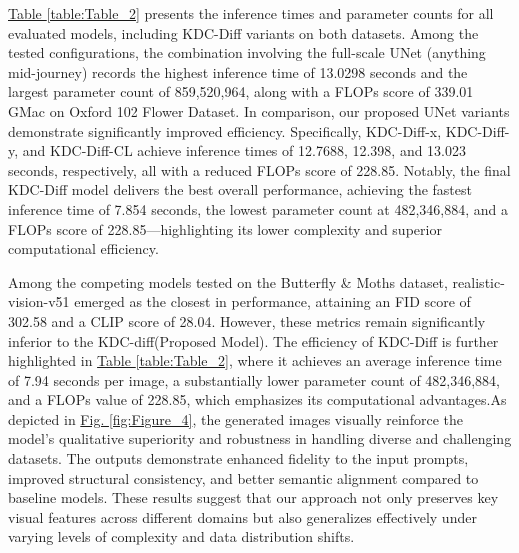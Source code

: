 \documentclass[a4paper,fleqn]{ieeetj}
\begin{document}
 \hyperref[table:Table_2]{Table \ref*{table:Table_2}} presents the inference times and parameter counts for all evaluated models, including KDC-Diff variants on both datasets. Among the tested configurations, the combination involving the full-scale UNet (anything mid-journey) records the highest inference time of 13.0298 seconds and the largest parameter count of 859,520,964, along with a FLOPs score of 339.01 GMac on Oxford 102 Flower Dataset. In comparison, our proposed UNet variants demonstrate significantly improved efficiency. Specifically, KDC-Diff-x, KDC-Diff-y, and KDC-Diff-CL achieve inference times of 12.7688, 12.398, and 13.023 seconds, respectively, all with a reduced FLOPs score of 228.85. Notably, the final KDC-Diff model delivers the best overall performance, achieving the fastest inference time of 7.854 seconds, the lowest parameter count at 482,346,884, and a FLOPs score of 228.85—highlighting its lower complexity and superior computational efficiency. 
 
 Among the competing models tested on the Butterfly \& Moths dataset, realistic-vision-v51 emerged as the closest in performance, attaining an FID score of 302.58 and a CLIP score of 28.04. However, these metrics remain significantly inferior to the KDC-diff(Proposed Model). The efficiency of KDC-Diff is further highlighted in  \hyperref[table:Table_2]{Table \ref*{table:Table_2}}, where it achieves an average inference time of 7.94 seconds per image, a substantially lower parameter count of 482,346,884, and a FLOPs value of 228.85, which emphasizes its computational advantages.As depicted in \hyperref[fig:Figure_4]{Fig. \ref*{fig:Figure_4}}, the generated images visually reinforce the model's qualitative superiority and robustness in handling diverse and challenging datasets. The outputs demonstrate enhanced fidelity to the input prompts, improved structural consistency, and better semantic alignment compared to baseline models. These results suggest that our approach not only preserves key visual features across different domains but also generalizes effectively under varying levels of complexity and data distribution shifts.
\end{document}
